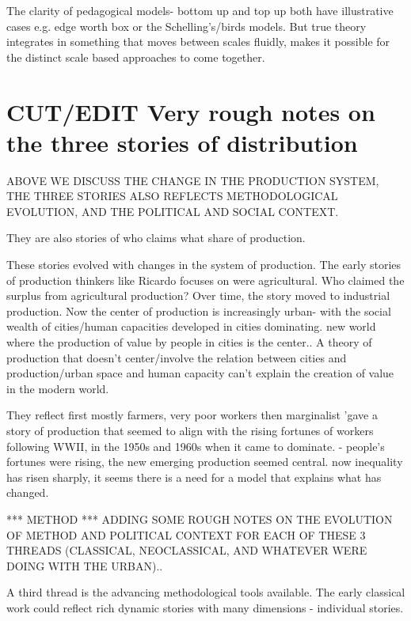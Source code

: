 The clarity of pedagogical models- bottom up and top up both have illustrative cases e.g. edge worth box or the Schelling's/birds models.
But true theory integrates in something that moves between scales fluidly, makes it possible for the distinct scale based approaches to come together.


\section{CUT/EDIT Very rough notes on the three stories of distribution}

ABOVE WE DISCUSS THE CHANGE IN THE PRODUCTION SYSTEM, THE THREE STORIES ALSO REFLECTS METHODOLOGICAL EVOLUTION, AND THE POLITICAL AND SOCIAL CONTEXT.

They are also %
stories of who claims what share of production. 

These stories evolved with changes in the system of production.
The early stories of production thinkers like Ricardo focuses on were agricultural. Who claimed the surplus from agricultural production? Over time, the story moved to industrial production.
Now the center of production is increasingly urban- with the social wealth of cities/human capacities developed in cities dominating. 
new world where the production of value by people in cities is the center..
A theory of production that doesn't center/involve the relation between cities and production/urban space and human capacity can't explain the creation of value in the modern world. %

They reflect
first mostly farmers, very poor workers
then marginalist  'gave a story of production that seemed to align with the rising fortunes of workers following WWII, in the 1950s and 1960s when it came to dominate. - people's fortunes were rising, the new emerging production seemed central.
now inequality has risen sharply, it seems there is a need for a model that explains what has changed.




*** METHOD ***
ADDING SOME ROUGH NOTES ON THE EVOLUTION OF METHOD AND POLITICAL CONTEXT FOR EACH OF THESE 3 THREADS (CLASSICAL, NEOCLASSICAL, AND WHATEVER WERE DOING WITH THE URBAN)..

A third thread is the advancing methodological tools available.
The early classical work could reflect rich dynamic stories with many dimensions - individual stories.

